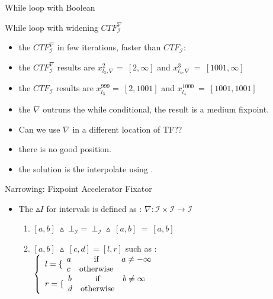 \begin{frame}{While loop with Boolean}
\begin{exampleblock}{While loop with widening $CTF_\mathcal{I}^\nabla$}
	\centering 
	\begin{itemize}
		\item the $CTF_\mathcal{I}^\nabla$ in few iterations, faster than $CTF_\mathcal{I}$:
	\item the $CTF_\mathcal{I}^\nabla$ results are $x_{l_3,\nabla}^2=~[2,\infty] $  and $x_{l_4,\nabla}^3~=~[1001, \infty] $\\	
\item the $CTF_\mathcal{I}$ results are $x_{l_3}^{999}=~[2,1001] $  and $x_{l_4}^{1000}~=~[1001,1001] $\\
\item the $\nabla$ outruns the while conditional, the result is a medium fixpoint.
		\item Can we use $\nabla$ in a different location of TF??
		\item there is no good position.
		\item the solution is the interpolate using \color{blue}{narrowing $\vartriangle$}.  
	\end{itemize}
\end{exampleblock}
\end{frame}


\begin{frame}{Narrowing: Fixpoint Accelerator Fixator}
\begin{itemize}
	\item The $\vartriangle I$  for intervals is defined as : $\nabla : \mathcal{I} \times \mathcal{I} \rightarrow \mathcal{I}$\\
	\begin{enumerate}
		\item $[a,b] ~\vartriangle ~\bot_\mathcal{I}= ~\bot_\mathcal{I} ~\vartriangle~ [a,b]~ = ~[a,b]  $
		\item$[a,b] ~\vartriangle ~[c,d]= [l,r]$ such as : \\   
		$	\left\{ \begin{array}{l}
		l = \{ \begin{array}{l c r} a & \mbox{if} & a \neq -\infty
		\\  c & \mbox{otherwise} &  \end{array}\\
		r = \{ \begin{array}{l c r} b & \mbox{if} & b \neq \infty
		\\  d & \mbox{otherwise} & \\ \end{array}\\
		\end{array}\right.$
	\end{enumerate}
	
\end{itemize}		
\end{frame}


